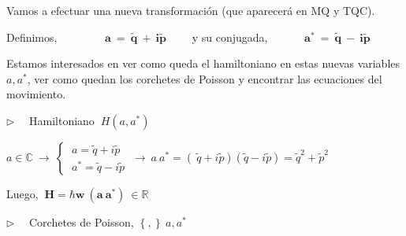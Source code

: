 \vspace{5mm} Vamos a efectuar una nueva transformación (que aparecerá en MQ y TQC).

\begin{definition}

Definimos, $\qquad \qquad \boldsymbol{ a \ = \ \widetilde q \ +\  i \widetilde p}\qquad  $ 	 y su conjugada, $\quad \qquad \boldsymbol{a^* \ = \ \widetilde q \ -\  i \widetilde p} $
\end{definition}
 

Estamos interesados en ver como queda el hamiltoniano en estas nuevas variables $a,a^*$, ver como quedan los corchetes de Poisson y encontrar las ecuaciones del movimiento.

\vspace{5mm} $\triangleright\quad$ Hamiltoniano $\ H(a,a^*)$

$a \in \mathbb C \ \to \ \begin{cases} \ a=\widetilde q + i \widetilde p  \\  \ a^*=\widetilde q - i \widetilde p \end{cases} \ \to \ a \ a^* =(\ \widetilde q + i \widetilde p )(\widetilde q - i \widetilde p )=\widetilde q^2+\widetilde p^2$

Luego, $\ \boldsymbol{H=\hbar w \ (a\ a^*)} \ \in \mathbb R$

\vspace{5mm} $\triangleright\quad$ Corchetes de Poisson, $\ \{\ ,\ \}\ \ a,a^*$

